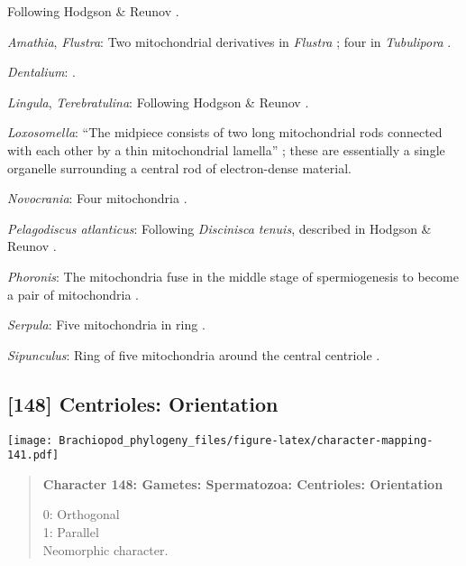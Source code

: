 \documentclass[openany]{book}
\theoremstyle{definition}
\theoremstyle{definition}
\theoremstyle{definition}
\theoremstyle{remark}
\begin{document}
Following Hodgson \& Reunov \citeyearpar{Hodgson1994Ultrastructureof}.

\hypertarget{Amathia-coding-147}{}
\emph{Amathia}, \emph{Flustra}: Two mitochondrial derivatives in
\emph{Flustra} \citep{Franzen1981, Franzen1977}; four in
\emph{Tubulipora} \citep{Franzen1984}.

\hypertarget{Dentalium-coding-147}{}
\emph{Dentalium}: \citet{DufresneDube1983}.

\hypertarget{Lingula-coding-147}{}
\emph{Lingula}, \emph{Terebratulina}: Following Hodgson \& Reunov
\citeyearpar{Hodgson1994Ultrastructureof}.

\hypertarget{Loxosomella-coding-147}{}
\emph{Loxosomella}: ``The midpiece consists of two long mitochondrial
rods connected with each other by a thin mitochondrial lamella''
\citep[in \emph{Loxosoma}]{Franzen2000}; these are essentially a single
organelle surrounding a central rod of electron-dense material.

\hypertarget{Novocrania-coding-147}{}
\emph{Novocrania}: Four mitochondria \citep{Afzelius1978Finestructure}.

\hypertarget{Pelagodiscus_atlanticus-coding-147}{}
\emph{Pelagodiscus atlanticus}: Following \emph{Discinisca}
\emph{tenuis}, described in Hodgson \& Reunov
\citeyearpar{Hodgson1994Ultrastructureof}.

\hypertarget{Phoronis-coding-147}{}
\emph{Phoronis}: The mitochondria fuse in the middle stage of
spermiogenesis to become a pair of mitochondria
\citep{Reunov2004Ultrastructuralstudy}.

\hypertarget{Serpula-coding-147}{}
\emph{Serpula}: Five mitochondria in ring \citep{Gherardi2011}.

\hypertarget{Sipunculus-coding-147}{}
\emph{Sipunculus}: Ring of five mitochondria around the central
centriole \citep{Rice1993}.

\subsection*{{[}148{]} Centrioles:
Orientation}\label{centrioles-orientation}

\texttt{[image: Brachiopod\_phylogeny\_files/figure-latex/character-mapping-141.pdf]}

\begin{quote}
\textbf{Character 148: Gametes: Spermatozoa: Centrioles: Orientation}

0: Orthogonal\\
1: Parallel\\
Neomorphic character.
\end{quote}
\end{document}
